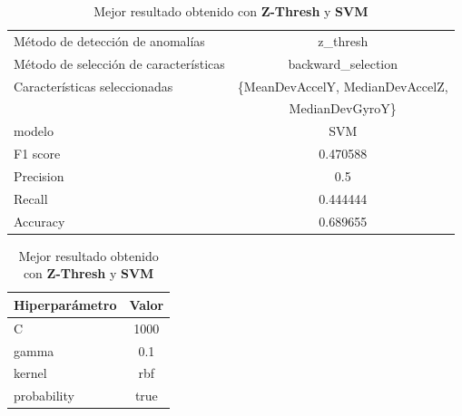 \begin{appendices}
		\begin{table}[htb]
			\caption{Mejor resultado obtenido con \textbf{Z-Thresh} y \textbf{SVM}}
			\label{table:25}
			\centering
			\begin{tabular}{lc}
				\toprule
					  Método de detección de anomalías &                                         z\_thresh \\
				Método de selección de características &                               backward\_selection  \\
						 Características seleccionadas & \{MeanDevAccelY, MedianDevAccelZ,  \\
						 							   &                                MedianDevGyroY\}  \\
												modelo &                                              SVM  \\
											  F1 score &                                         0.470588 \\
											 Precision &                                              0.5 \\
												Recall &                                         0.444444 \\
											  Accuracy &                                         0.689655 \\
				\bottomrule
			\end{tabular}
			\newline
			\newline

			\begin{tabular}{lc}
				\toprule
				Hiperparámetro & Valor \\
				\midrule
							 C &  1000 \\
						 gamma &   0.1 \\
						kernel &   rbf \\
				   probability &  true \\
				\bottomrule
			\end{tabular}
			
		\end{table}


\end{appendices}
